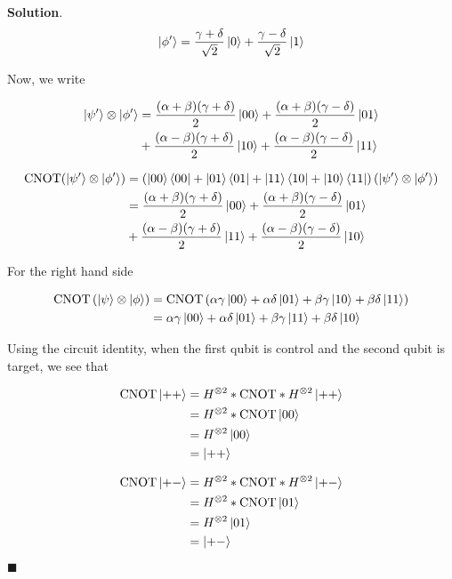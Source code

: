 \documentclass[12pt]{article}
\theoremstyle{definition}
\newenvironment{s}{%
        \begin{trivlist} \item \textbf{Solution}. }{%
            \hspace*{\fill} $\blacksquare$\end{trivlist}}%
\begin{document}
{\begin{s}
\begin{equation*}
\ket{\phi'} = \frac{\gamma+\delta}{\sqrt{2}}\ket{0} + \frac{\gamma-\delta}{\sqrt{2}}\ket{1}
\end{equation*}

Now, we write

\begin{align*}
\ket{\psi'}\otimes\ket{\phi'} &= \frac{(\alpha+\beta)(\gamma+\delta)}{2}\ket{00} + \frac{(\alpha+\beta)(\gamma-\delta)}{2}\ket{01} \\
&+ \frac{(\alpha-\beta)(\gamma+\delta)}{2}\ket{10} + \frac{(\alpha-\beta)(\gamma-\delta)}{2}\ket{11}
\end{align*}

\begin{align*}
\mathrm{CNOT}(\ket{\psi'}\otimes\ket{\phi'}) &= \left(\ket{00}\bra{00} + \ket{01}\bra{01} + \ket{11}\bra{10} + \ket{10}\bra{11}\right)(\ket{\psi'}\otimes\ket{\phi'})\\
&= \frac{(\alpha+\beta)(\gamma+\delta)}{2}\ket{00} + \frac{(\alpha+\beta)(\gamma-\delta)}{2}\ket{01} \\
&+ \frac{(\alpha-\beta)(\gamma+\delta)}{2}\ket{11} + \frac{(\alpha-\beta)(\gamma-\delta)}{2}\ket{10}
\end{align*}

For the right hand side 

\begin{align*}
\mathrm{CNOT}\left(\ket{\psi}\otimes \ket{\phi}\right) &= \mathrm{CNOT}\left(\alpha\gamma\ket{00} + \alpha\delta\ket{01} + \beta\gamma\ket{10} + \beta\delta\ket{11}\right)\\
&= \alpha\gamma\ket{00} + \alpha\delta\ket{01} + \beta\gamma\ket{11} + \beta\delta\ket{10}
\end{align*}

Using the circuit identity, when the first qubit is control and the second qubit is target, we see that

\begin{align*}
\mathrm{CNOT}\ket{++}  &= H^{\otimes 2}*\mathrm{CNOT}*H^{\otimes 2}\ket{++}\\  
&=  H^{\otimes 2}*\mathrm{CNOT}\ket{00}\\
&= H^{\otimes 2}\ket{00}\\
&= \ket{++}
\end{align*}

\begin{align*}
\mathrm{CNOT}\ket{+-}  &= H^{\otimes 2}*\mathrm{CNOT}*H^{\otimes 2}\ket{+-}\\  
&=  H^{\otimes 2}*\mathrm{CNOT}\ket{01}\\
&= H^{\otimes 2}\ket{01}\\
&= \ket{+-}
\end{align*}


\end{s}}
\end{document}
